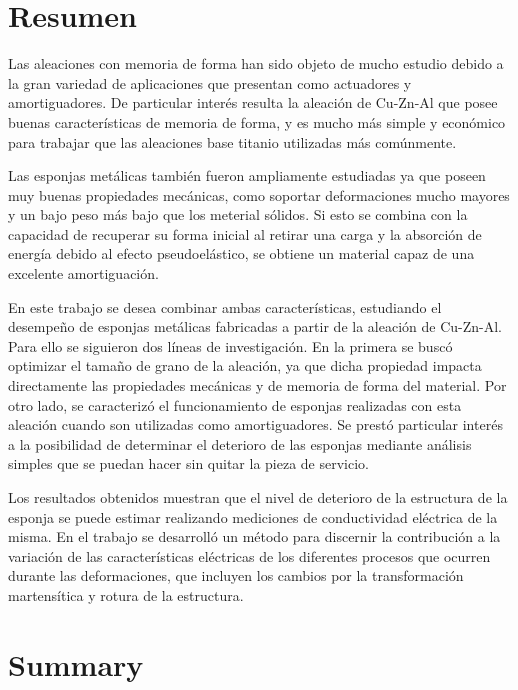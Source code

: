 \documentclass[a4paper,12pt,fleqn,twoside,openany]{book}
\begin{document}


\tableofcontents

\chapter*{Resumen}

Las aleaciones con memoria de forma han sido objeto de mucho estudio debido a la gran variedad de aplicaciones que presentan como actuadores y amortiguadores. De particular interés resulta la aleación de Cu-Zn-Al que posee buenas características de memoria de forma, y es mucho más simple y económico para trabajar que las aleaciones base titanio utilizadas más comúnmente.
 
Las esponjas metálicas también fueron ampliamente estudiadas ya que poseen muy buenas propiedades mecánicas, como soportar deformaciones mucho mayores y un bajo peso más bajo que los meterial sólidos. Si esto se combina con la capacidad de recuperar su forma inicial al retirar una carga y la absorción de energía debido al efecto pseudoelástico, se obtiene un material capaz de una excelente amortiguación.
 
En este trabajo se desea combinar ambas características, estudiando el desempeño de esponjas metálicas fabricadas a partir de la aleación de Cu-Zn-Al. Para ello se siguieron dos líneas de investigación. En la primera se buscó optimizar el tamaño de grano de la aleación, ya que dicha propiedad impacta directamente las propiedades mecánicas y de memoria de forma del material. Por otro lado, se caracterizó el funcionamiento de esponjas realizadas con esta aleación cuando son utilizadas como amortiguadores. Se prestó particular interés a la posibilidad de determinar el deterioro de las esponjas mediante análisis simples que se puedan hacer sin quitar la pieza de servicio.
 
Los resultados obtenidos muestran que el nivel de deterioro de la estructura de la esponja se puede estimar realizando mediciones de conductividad eléctrica de la misma. En el trabajo se desarrolló un método para discernir la contribución a la variación de las características eléctricas de los diferentes procesos que ocurren durante las deformaciones, que incluyen los cambios por la transformación martensítica y rotura de la estructura.

\chapter*{Summary}
\end{document}

